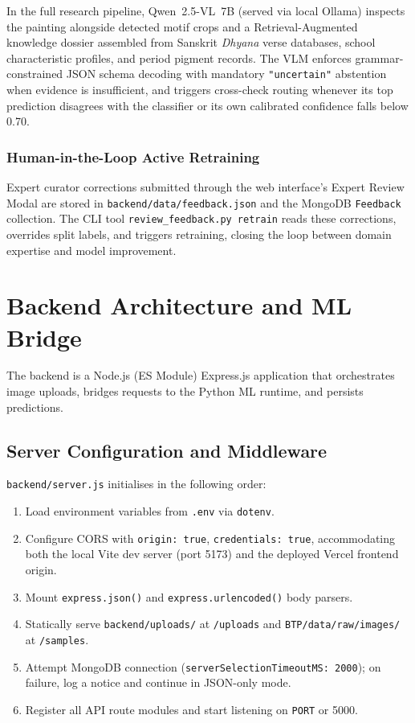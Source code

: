 \documentclass[12pt, a4paper, twoside]{article}
\begin{document}
In the full research pipeline, Qwen~2.5-VL~7B (served via local Ollama) inspects the painting alongside detected motif crops and a Retrieval-Augmented knowledge dossier assembled from Sanskrit \textit{Dhyana} verse databases, school characteristic profiles, and period pigment records. The VLM enforces grammar-constrained JSON schema decoding with mandatory \texttt{"uncertain"} abstention when evidence is insufficient, and triggers cross-check routing whenever its top prediction disagrees with the classifier or its own calibrated confidence falls below 0.70.

\subsubsection{Human-in-the-Loop Active Retraining}

Expert curator corrections submitted through the web interface's Expert Review Modal are stored in \texttt{backend/data/feedback.json} and the MongoDB \texttt{Feedback} collection. The CLI tool \texttt{review\_feedback.py retrain} reads these corrections, overrides split labels, and triggers retraining, closing the loop between domain expertise and model improvement.

\section{Backend Architecture and ML Bridge}
\label{sec:backend}

The backend is a Node.js (ES Module) Express.js application that orchestrates image uploads, bridges requests to the Python ML runtime, and persists predictions.

\subsection{Server Configuration and Middleware}

\texttt{backend/server.js} initialises in the following order:

\begin{enumerate}
  \item Load environment variables from \texttt{.env} via \texttt{dotenv}.
  \item Configure CORS with \texttt{origin: true}, \texttt{credentials: true}, accommodating both the local Vite dev server (port 5173) and the deployed Vercel frontend origin.
  \item Mount \texttt{express.json()} and \texttt{express.urlencoded()} body parsers.
  \item Statically serve \texttt{backend/uploads/} at \texttt{/uploads} and \texttt{BTP/data/raw/images/} at \texttt{/samples}.
  \item Attempt MongoDB connection (\texttt{serverSelectionTimeoutMS: 2000}); on failure, log a notice and continue in JSON-only mode.
  \item Register all API route modules and start listening on \texttt{PORT} or 5000.
\end{enumerate}
\end{document}

